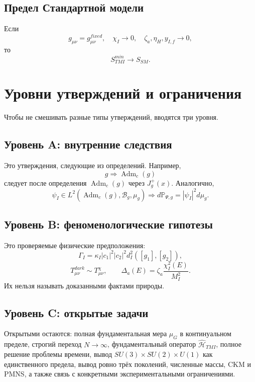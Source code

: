 \documentclass[12pt,a4paper]{article}
\DeclareMathOperator{\Adm}{Adm}
\newcommand{\Prob}{\mathbb P}
\begin{document}
\subsection{Предел Стандартной модели}
Если
\[
\boxed{g_{\mu\nu}=g_{\mu\nu}^{fixed},\quad \chi_I\to0,
\quad \zeta_a,\eta_H,y_{I,f}\to0,}
\]
то
\[
\boxed{S_{TMI}^{min}\to S_{SM}.}
\]

\section{Уровни утверждений и ограничения}
Чтобы не смешивать разные типы утверждений, вводятся три уровня.

\subsection{Уровень A: внутренние следствия}
Это утверждения, следующие из определений. Например,
\[
\boxed{g\Rightarrow\Adm_c(g)}
\]
следует после определения $\Adm_c(g)$ через $J_g^+(x)$. Аналогично,
\[
\boxed{\psi_I\in L^2(\Adm_c(g),\mathcal B_g,\mu_g)
\Rightarrow d\Prob_{\Psi,g}=|\psi_I|^2d\mu_g.}
\]

\subsection{Уровень B: феноменологические гипотезы}
Это проверяемые физические предположения:
\[
\boxed{\Gamma_I=\kappa_I|c_1|^2|c_2|^2d_I^2([g_1],[g_2]),}
\]
\[
\boxed{T_{\mu\nu}^{dark}\sim T_{\mu\nu}^{\chi},}
\qquad
\boxed{\Delta_a(E)=\zeta_a\frac{\chi_I^2(E)}{M_I^2}.}
\]
Их нельзя называть доказанными фактами природы.

\subsection{Уровень C: открытые задачи}
Открытыми остаются: полная фундаментальная мера $\mu_G$ в континуальном пределе, строгий переход $N\to\infty$, фундаментальный оператор $\widehat{\mathcal H}_{TMI}$, полное решение проблемы времени, вывод $SU(3)\times SU(2)\times U(1)$ как единственного предела, вывод ровно трёх поколений, численные массы, CKM и PMNS, а также связь с конкретными экспериментальными ограничениями.
\end{document}

